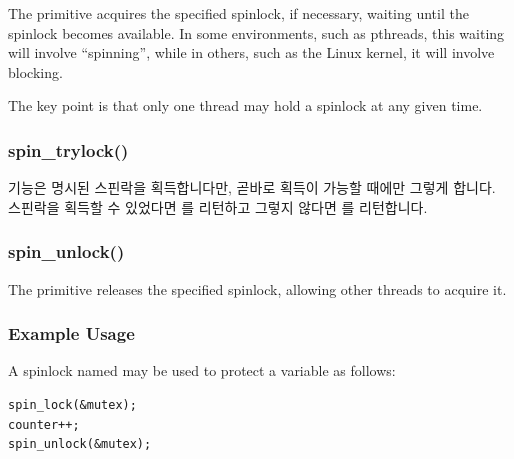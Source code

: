The  primitive acquires the specified spinlock,
if necessary, waiting until the spinlock becomes available.
In some environments, such as pthreads, this waiting will involve
``spinning'', while
in others, such as the Linux kernel, it will involve blocking.

The key point is that only one thread may hold a spinlock at any
given time.
\fi

\subsubsection{spin\_trylock()}

 기능은 명시된 스핀락을 획득합니다만, 곧바로 획득이 가능할
때에만 그렇게 합니다.
스핀락을 획득할 수 있었다면  를 리턴하고 그렇지 않다면  를
리턴합니다.

\subsubsection{spin\_unlock()}

The  primitive releases the specified spinlock,
allowing other threads to acquire it.


\subsubsection{Example Usage}

A spinlock named  may be used to protect a variable
 as follows:

\vspace{5pt}
\begin{minipage}[t]{\columnwidth}
\small
\begin{verbatim}
spin_lock(&mutex);
counter++;
spin_unlock(&mutex);
\end{verbatim}
\end{minipage}
\vspace{5pt}

